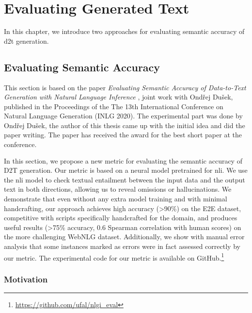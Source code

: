 
\chapter{Evaluating Generated Text}
\label{chap:evaluation}


In this chapter, we introduce two approaches for evaluating semantic accuracy of \ac{d2t} generation.

\section{Evaluating Semantic Accuracy}
\label{sec:sem-acc}

\begin{refbox}
    This section is based on the paper \emph{Evaluating Semantic Accuracy of Data-to-Text Generation with Natural Language Inference} \cite{dusekEvaluatingSemanticAccuracy2020}, joint work with Ondřej Dušek, published in the Proceedings of the The 13th International Conference on Natural Language Generation (INLG 2020). The experimental part was done by Ondřej Dušek, the author of this thesis came up with the initial idea and did the paper writing. The paper has received the award for the best short paper at the conference.
\end{refbox}

In this section, we propose a new metric for evaluating the semantic accuracy of D2T generation. Our metric is based on a neural model pretrained for \ac{nli}.
We use the \ac{nli} model to check textual entailment between the input data and the output text in both directions, allowing us to reveal omissions or hallucinations.
We demonstrate that even without any extra model training and with minimal handcrafting, our approach achieves high accuracy (>90\%) on the E2E dataset, competitive with scripts specifically handcrafted for the domain, and produces useful results (>75\% accuracy, 0.6 Spearman correlation with human scores) on the more challenging WebNLG dataset. Additionally, we show with manual error analysis that some instances marked as errors were in fact assessed correctly by our metric. The experimental code for our metric is available on GitHub.\footnote{\url{https://github.com/ufal/nlgi_eval}}

\subsection{Motivation}

